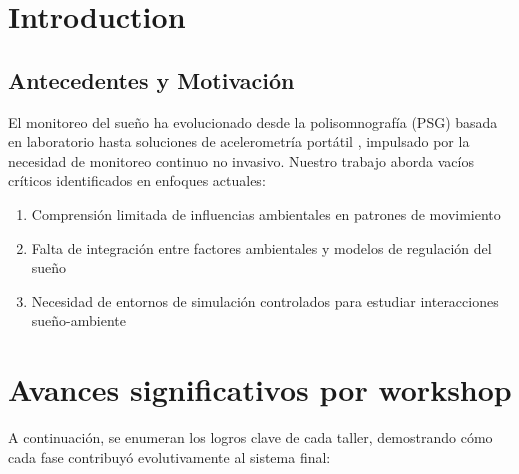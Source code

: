 \documentclass[conference]{IEEEtran}
\begin{document}
\section{Introduction}
\subsection{Antecedentes y Motivación}
El monitoreo del sueño ha evolucionado desde la polisomnografía (PSG) basada en laboratorio hasta soluciones de acelerometría portátil \cite{AccelerometryReview}, impulsado por la necesidad de monitoreo continuo no invasivo. Nuestro trabajo aborda vacíos críticos identificados en enfoques actuales\cite{Sadeh1994}:
\begin{enumerate}
    \item Comprensión limitada de influencias ambientales en patrones de movimiento
    \item Falta de integración entre factores ambientales y modelos de regulación del sueño
    \item Necesidad de entornos de simulación controlados para estudiar interacciones sueño-ambiente
\end{enumerate}
\section{Avances significativos por workshop}

A continuación, se enumeran los logros clave de cada taller, demostrando cómo cada fase contribuyó evolutivamente al sistema final:
\end{document}
